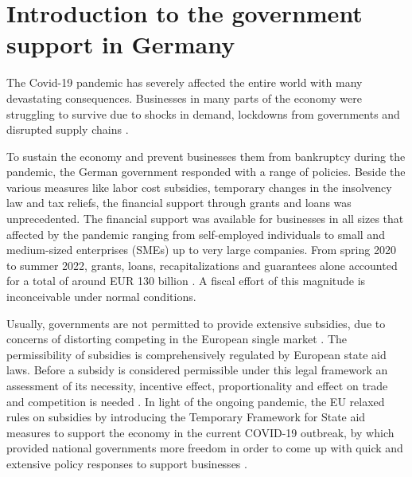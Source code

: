 
\chapter{Introduction to the government support in Germany} %

\label{Chapter1} %




The Covid-19 pandemic has severely affected the entire world with many devastating consequences. Businesses in many parts of the economy were struggling to survive due to shocks in demand, lockdowns from governments and disrupted supply chains \parencite{eu_com_temporary_2020}.

To sustain the economy and prevent businesses them from bankruptcy during the pandemic, the German government responded with a range of policies. Beside the various measures like labor cost subsidies, temporary changes in the insolvency law and tax reliefs, the financial support through grants and loans was unprecedented. The financial support was available for businesses in all sizes that affected by the pandemic ranging from self-employed individuals to small and medium-sized enterprises (SMEs) up to very large companies. From spring 2020 to summer 2022, grants, loans, recapitalizations and guarantees alone accounted for a total of around EUR 130 billion \parencite{bmwk_uberblickspapier_2022}. A fiscal effort of this magnitude is inconceivable under normal conditions.

Usually, governments are not permitted to provide extensive subsidies, due to concerns of distorting competing in the European single market \parencite{claici_european_2022}. 
The permissibility of subsidies is comprehensively regulated by European state aid laws. Before a subsidy is considered permissible under this legal framework an assessment of its necessity, incentive effect, proportionality and effect on trade and competition is needed \parencite{claici_european_2022}. 
In light of the ongoing pandemic, the EU relaxed rules on subsidies by introducing the Temporary Framework for State aid measures to support the economy in the current COVID-19 outbreak, by which provided national governments more freedom in order to come up with quick and extensive policy responses to support businesses \parencite{eu_com_temporary_2020}.

